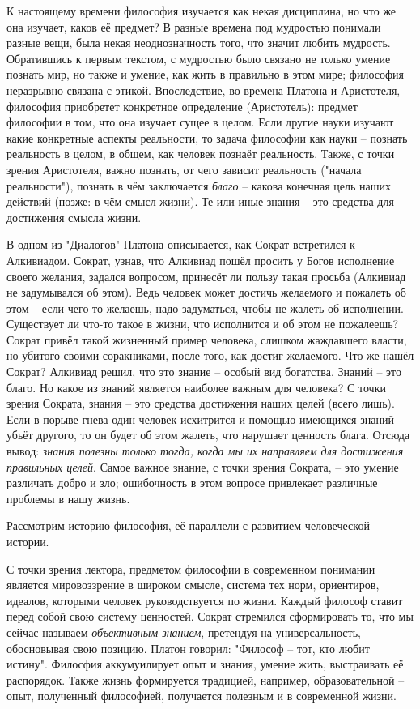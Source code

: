 \documentclass[a4paper, 12pt]{book} %
\begin{document}
К настоящему времени философия изучается как некая дисциплина, но что же она изучает, каков её предмет? В разные времена под мудростью понимали разные вещи, была некая неоднозначность того, что значит любить мудрость. Обратившись к первым текстом, с мудростью было связано не только умение познать мир, но также и умение, как жить в правильно в этом мире; философия неразрывно связана с этикой. Впоследствие, во времена Платона и Аристотеля, философия приобретет конкретное определение (Аристотель): предмет философии в том, что она изучает сущее в целом. Если другие науки изучают какие конкретные аспекты реальности, то задача философии как науки -- познать реальность в целом, в общем, как человек познаёт реальность. Также, с точки зрения Аристотеля, важно познать, от чего зависит реальность ("начала реальности"), познать в чём заключается \textit{благо} -- какова конечная цель наших действий (позже: в чём смысл жизни). Те или иные знания -- это средства для достижения смысла жизни. 

В одном из "Диалогов" Платона описывается, как Сократ встретился к Алкивиадом. Сократ, узнав, что Алкивиад пошёл просить у Богов исполнение своего желания, задался вопросом, принесёт ли пользу такая просьба (Алкивиад не задумывался об этом). Ведь человек может достичь желаемого и пожалеть об этом -- если чего-то желаешь, надо задуматься, чтобы не жалеть об исполнении. Существует ли что-то такое в жизни, что исполнится и об этом не пожалеешь? Сократ привёл такой жизненный пример человека, слишком жаждавшего власти, но убитого своими соракниками, после того, как достиг желаемого. Что же нашёл Сократ? Алкивиад решил, что это знание -- особый вид богатства. Знаний -- это благо. Но какое из знаний является наиболее важным для человека? С точки зрения Сократа, знания -- это средства достижения наших целей (всего лишь). Если в порыве гнева один человек исхитрится и помощью имеющихся знаний убьёт другого, то он будет об этом жалеть, что нарушает ценность блага. Отсюда вывод: \textit{знания полезны только тогда, когда мы их направляем для достижения правильных целей}. Самое важное знание, с точки зрения Сократа, -- это умение различать добро и зло; ошибочность в этом вопросе привлекает различные проблемы в нашу жизнь.

Рассмотрим историю философия, её параллели с развитием человеческой истории.

С точки зрения лектора, предметом философии в современном понимании является мировоззрение в широком смысле, система тех норм, ориентиров, идеалов, которыми человек руководствуется по жизни. Каждый философ ставит перед собой свою систему ценностей. Сократ стремился сформировать то, что мы сейчас называем \textit{объективным знанием}, претендуя на универсальность, обосновывая свою позицию. Платон говорил: "Философ -- тот, кто любит истину". Филосфия аккумуилирует опыт и знания, умение жить, выстраивать её распорядок. Также жизнь формируется традицией, например, образовательной -- опыт, полученный философией, получается полезным и в современной жизни.
\end{document}
